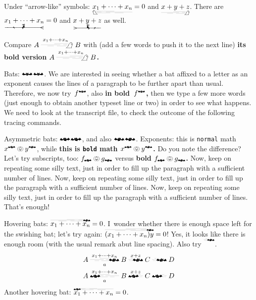 \documentclass[a4paper]{article}
\newcommand*{\sumxn}{x_{1}+\dots+x_{n}}
\begin{document}
Under ``arrow-like'' symbols: \( \underleftswishingghost{\sumxn}=0 \) and \(
\underrightswishingghost{x+y+z} \).  There are \(
\underleftwitchonbroom*{\sumxn}=0 \) and \( \underrightwitchonbroom*{x+y+z} \)
as well.

Compare \( A\xrightswishingghost{\sumxn} B \) with (add a few words to push it
to the next line) {\bfseries\boldmath its bold version \(
A\xrightswishingghost{\sumxn} B \).}

\bigbreak

Bats: $\mathbat${\boldmath $\mathbat$}.  We are interested in seeing whether a
bat affixed to a letter as an exponent causes the lines of a paragraph to be
further apart than usual.  Therefore, we now try~$f^{\mathbat}$, also
{\bfseries\boldmath in bold~$f^{\mathbat}$,} then we type a few more words (just
enough to obtain another typeset line or two) in order to see what happens.  We
need to look at the transcript file, to check the outcome of the following
tracing commands.


Asymmetric bats: $\mathleftbat${\boldmath $\mathleftbat$}, and also
$\mathrightbat${\boldmath $\mathrightbat$}.  Exponents: this is \texttt{normal}
math \( x^{\mathleftbat} \pumpkin y^{\mathrightbat} \), while
{\bfseries\boldmath this is \texttt{bold} math \( x^{\mathleftbat} \pumpkin
y^{\mathrightbat} \).} Do you note the difference?  Let's try subscripts, too:
\( f_{\mathleftbat} \pumpkin g_{\mathrightbat} \) versus {\bfseries\boldmath
bold \( f_{\mathleftbat} \pumpkin g_{\mathrightbat} \).}
Now, keep on repeating some silly text, just in order to fill up the paragraph
with a sufficient number of lines.  Now, keep on repeating some silly text, just
in order to fill up the paragraph with a sufficient number of lines.  Now, keep
on repeating some silly text, just in order to fill up the paragraph with a
sufficient number of lines.  That's enough!

Hovering bats: \( \overrightflutteringbat{\sumxn}=0 \).  I~wonder whether there
is enough space left for the swishing bat; let's try again:
\( \overrightflutteringbat{(\sumxn)y}=0 \)!  Yes, it looks like there is enough
room (with the usual remark abut line spacing).  Also try
\( \overrightflutteringbat{\mathstrut} \).
\begin{gather*}
	A \xrightflutteringbat[a]{\sumxn} B \xrightflutteringbat{x+z}
		C \xrightflutteringbat{} D  \\
	A \xleftflutteringbat[a]{\sumxn} B \xleftflutteringbat{x+z} C
		\xleftflutteringbat{} D
\end{gather*}
Another hovering bat: \( \overleftflutteringbat{\sumxn}=0 \).
\end{document}
